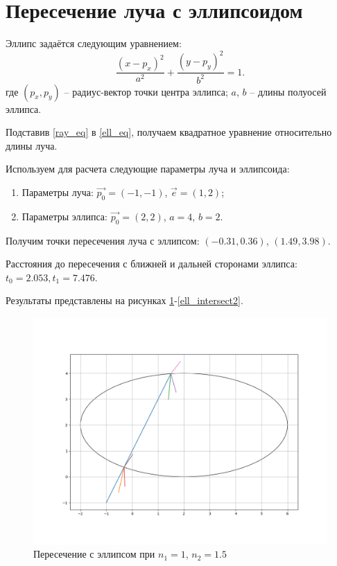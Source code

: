 \section{Пересечение луча с эллипсоидом}{
	Эллипс задаётся следующим уравнением:
	\begin{equation}\label{ell_eq}
		\frac{(x - p_x)^2}{a^2} + \frac{(y - p_y)^2}{b^2} = 1.
	\end{equation}
	где $(p_x, p_y)$ -- радиус-вектор точки центра эллипса; $a$, $b$ -- длины полуосей эллипса.
	
	Подставив \eqref{ray_eq} в \eqref{ell_eq}, получаем квадратное уравнение относительно длины луча. 
	
	Используем для расчета следующие параметры луча и эллипсоида:
	\begin{enumerate}
	\item Параметры луча: $\vec{p_0} = (-1, -1)$, $\vec{e} = (1, 2)$;
	\item Параметры эллипса: $\vec{p_0} = (2, 2)$, $a = 4$, $b = 2$.
	\end{enumerate}
	
	Получим точки пересечения луча с эллипсом: $(-0.31, 0.36)$, $(1.49, 3.98)$.
	
	Расстояния до пересечения с ближней и дальней сторонами эллипса: ${t_0 = 2.053, t_1 = 7.476}$.
		
	Результаты представлены на рисунках \ref{ell_intersect1}-\ref{ell_intersect2}.
	
	\begin{figure}[H]
		\includegraphics[width=0.7\pagewidth]{ell_intersect1}
		\caption{Пересечение с эллипсом при $n_1 = 1$, $n_2 = 1.5$}
		\label{ell_intersect1}
	\end{figure}
	
}

